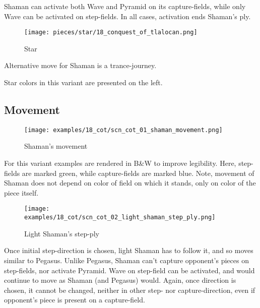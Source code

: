 Shaman can activate both Wave and Pyramid on its capture-fields, while only
Wave can be activated on step-fields. In all cases, activation ends Shaman's
ply.

\noindent
\begin{wrapfigure}{l}{0.4\textwidth}
\centering
\texttt{[image: pieces/star/18\_conquest\_of\_tlalocan.png]}
\caption{Star}
\label{fig:star/18_conquest_of_tlalocan}
\end{wrapfigure}
Alternative move for Shaman is a trance-journey.

Star colors in this variant are presented on the left.

\clearpage %

\subsection*{Movement}
\label{sec:Conquest of Tlalocan/Shaman/Movement}

\vspace*{-1.2\baselineskip}
\noindent
\begin{figure}[!h]
\texttt{[image: examples/18\_cot/scn\_cot\_01\_shaman\_movement.png]}
\caption{Shaman's movement}
\label{fig:scn_cot_01_shaman_movement}
\end{figure}

For this variant examples are rendered in B\&W to improve legibility.
Here, step-fields are marked green, while capture-fields are marked blue.
Note, movement of Shaman does not depend on color of field on which it
stands, only on color of the piece itself.

\clearpage %

\noindent
\begin{figure}[!h]
\texttt{[image: examples/18\_cot/scn\_cot\_02\_light\_shaman\_step\_ply.png]}
\caption{Light Shaman's step-ply}
\label{fig:scn_cot_02_light_shaman_step_ply}
\end{figure}

Once initial step-direction is chosen, light Shaman has to follow it,
and so moves similar to Pegasus. Unlike Pegasus, Shaman can't capture
opponent's pieces on step-fields, nor activate Pyramid. Wave on step-field
can be activated, and would continue to move as Shaman (and Pegasus)
would. Again, once direction is chosen, it cannot be changed, neither
in other step- nor capture-direction, even if opponent's piece is present
on a capture-field.

